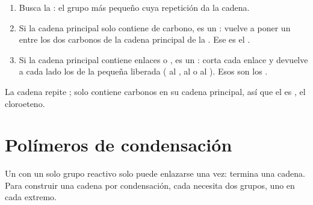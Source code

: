 \begin{method}\label{met:g12:polymers:monomer}
\begin{enumerate}
  \item Busca la : el grupo más pequeño cuya
        repetición da la cadena.
  \item Si la cadena principal solo contiene  de carbono, es un
        : vuelve a poner un  entre los dos
        carbonos de la cadena principal de la . Ese
        es el .
  \item Si la cadena principal contiene enlaces  o , es un
        : corta cada enlace y devuelve a cada lado
        los  de la  pequeña liberada ( al ,
         al  o al ). Esos son los .
\end{enumerate}
\end{method}

\begin{example}\label{ex:g12:polymers:pvc}
La cadena  repite ; solo
contiene carbonos en su cadena principal, así que el  es
, el cloroeteno.
\end{example}

\section{Polímeros de condensación}

Un  con un solo grupo reactivo solo puede enlazarse una vez:
termina una cadena. Para construir una cadena por condensación, cada
 necesita dos grupos, uno en cada extremo.

